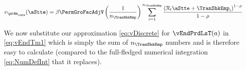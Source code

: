 \documentclass[titlepage, headings=optiontotocandhead]{Resources/texmf-local/tex/latex/econtex}
\begin{document}
\lstset{basicstyle=\ttfamily\footnotesize,breaklines=true,language=Python,frame=single}
\nopagebreak

  \begin{equation}\begin{gathered}\begin{aligned}
        v_{{\prdm}_\cntn}(\aStte)  & =   \beta \PermGroFacAdjV\left(\frac{1}{n_{\TranShkEmp}}\right)\sum_{i=1}^{n_{\TranShkEmp}}   \frac{\left(\mathcal{R}_{t} \aStte + \TranShkEmp_{i}\right)^{1-\rho}}{1-\rho} \label{eq:vDiscrete}
      \end{aligned}\end{gathered}\end{equation}

We now substitute our approximation \eqref{eq:vDiscrete} for $\vEndPrdLsT(a)$ in \eqref{eq:vEndTm1} which is simply the sum of $n_{\TranShkEmp}$ numbers and is therefore easy to calculate (compared to the full-fledged numerical integration \eqref{eq:NumDefInt} that it replaces).




\begin{comment}
  In the {\SMDSOPntbk} notebook, the section ``Discretization of the Income Shock Distribution'' provides code that instantiates the \texttt{DiscreteApproximation} class defined in the \texttt{resources} module. This class creates a 7-point discretization of the continuous log-normal distribution of transitory shocks to income by utilizing seven points, where the mean value is $-.5 \sigma^2$, and the standard deviation is $\sigma = .5$.

  A close look at the \texttt{DiscreteApproximation} class and its subclasses should convince you that the code is simply a computational implementation of the mathematical description of equiprobable discrete approximation in this section. Moreover, the Python code generates a graph of the discretized distribution depicted in \ref{fig:discreteapprox}.
\end{comment}
\end{document}
